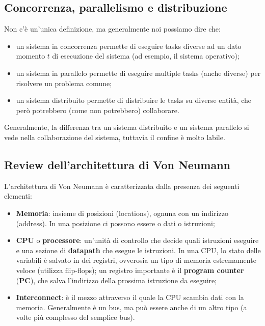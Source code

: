 \subsection{Concorrenza, parallelismo e distribuzione}

Non c'è un'unica definizione, ma generalmente noi possiamo dire che:
\begin{itemize}
    \item un sistema in concorrenza permette di eseguire tasks diverse ad un dato momento $t$ di esecuzione del sistema (ad esempio, il sistema operativo);
    \item un sistema in parallelo permette di eseguire multiple tasks (anche diverse) per risolvere un problema comune;
    \item un sistema distribuito permette di distribuire le tasks su diverse entità, che però potrebbero (come non potrebbero) collaborare.
\end{itemize}

 Generalmente, la differenza tra un sistema distribuito e un sistema parallelo si vede nella collaborazione del sistema, tuttavia il confine è molto labile.


\subsection{Review dell'architettura di Von Neumann}

L'architettura di Von Neumann è caratterizzata dalla presenza dei seguenti elementi:
\begin{itemize}
    \item \textbf{Memoria}: insieme di posizioni (locations), ognuna con un indirizzo (address). In una posizione ci possono essere o dati o istruzioni;
    \item \textbf{CPU} o \textbf{processore}: un'unità di controllo che decide quali istruzioni eseguire e una sezione di \textbf{datapath} che esegue le istruzioni. In una CPU, lo stato delle variabili è salvato in dei registri, ovverosia un tipo di memoria estremamente veloce (utilizza flip-flops); un registro importante è il \textbf{program counter} (\textbf{PC}), che salva l'indirizzo della prossima istruzione da eseguire;
    \item \textbf{Interconnect}: è il mezzo attraverso il quale la CPU scambia dati con la memoria. Generalmente è un bus, ma può essere anche di un altro tipo (a volte più complesso del semplice bus).
\end{itemize}

